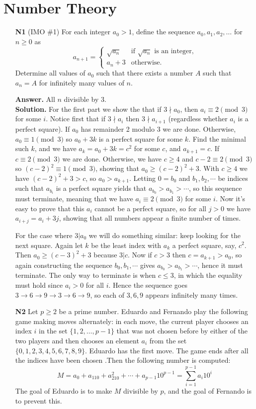 \documentclass[11pt,a4paper]{article}
\begin{document}
\section{Number Theory}
\begin{enumerate}
	\item[\textbf{N1}](IMO \#1) For each integer $a_0 > 1$, define the sequence $a_0, a_1, a_2, \ldots$ for $n \geq 0$ as
	$$a_{n+1} = 
	\begin{cases}
	\sqrt{a_n} & \text{if } \sqrt{a_n} \text{ is an integer,} \\
	a_n + 3 & \text{otherwise.}
	\end{cases}
	$$Determine all values of $a_0$ such that there exists a number $A$ such that $a_n = A$ for infinitely many values of $n$.
	
	\textbf{Answer.} All $n$ divisible by 3. \\
	\textbf{Solution.} 
	For the first part we show the that if $3\nmid a_0$, then $a_i\equiv 2\pmod{3}$ for some $i$. Notice first that if $3\nmid a_i$ then $3\nmid a_{i+1}$ (regardless whether $a_i$ is a perfect square). If $a_0$ has remainder 2 modulo 3 we are done. Otherwise, $a_0\equiv 1\pmod{3}$ so $a_0+3k$ is a perfect square for some $k$. Find the minimal such $k$, and we have $a_k=a_0+3k=c^2$ for some $c$, and $a_{k+1}=c$. If $c\equiv 2\pmod{3}$ we are done. Otherwise, we have $c\ge 4$ and $c-2\equiv 2\pmod{3}$ so $(c-2)^2\equiv 1\pmod{3}$, showing that $a_0\ge (c-2)^2+3$. With $c\ge 4$ we have $(c-2)^2+3 > c$, so $a_0>a_{k+1}$. Letting $0=b_0$ and $b_1, b_2, \cdots$ be indices such that $a_{b_i}$ is a perfect square yields that $a_{b_0}>a_{b_1}>\cdots$, so this sequence must terminate, meaning that we have $a_i\equiv 2\pmod{3}$ for some $i$. Now it's easy to prove that this $a_i$ cannot be a perfect square, so for all $j>0$ we have $a_{i+j}=a_i+3j$, showing that all numbers appear a finite number of times. 
	
	For the case where $3|a_0$ we will do something similar: keep looking for the next square. Again let $k$ be the least index with $a_k$ a perfect square, say, $c^2$. Then $a_0\ge (c-3)^2+3$ because $3|c$. Now if $c>3$ then $c=a_{k+1}>a_0$, so again constructing the sequence $b_0, b_1, \cdots$ gives $a_{b_0}>a_{b_1}>\cdots$, hence it must terminate. The only way to terminate is when $c\le 3$, in which the equality must hold since $a_i>0$ for all $i$. Hence the sequence goes $3\to 6\to 9\to 3\to 6\to 9$, so each of $3, 6, 9$ appears infinitely many times. 
	
	\item[\textbf{N2}]Let $ p \geq 2$ be a prime number. Eduardo and Fernando play the following game making moves alternately: in each move, the current player chooses an index $i$ in the set $\{1,2,\ldots, p-1 \}$ that was not chosen before by either of the two players and then chooses an element $a_i$ from the set $\{0,1,2,3,4,5,6,7,8,9\}$. Eduardo has the first move. The game ends after all the indices have been chosen .Then the following number is computed:
	$$M=a_0+a_110+a_210^2+\cdots+a_{p-1}10^{p-1}= \sum_{i=1}^{p-1}a_i10^i$$
	The goal of Eduardo is to make  $M$ divisible by $p$, and the goal of Fernando is to prevent this.
	

\end{enumerate}
\end{document}
